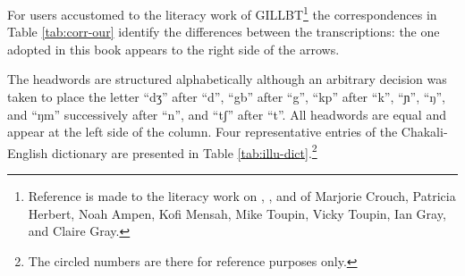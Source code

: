 \newpage 
For users accustomed to the literacy work of GILLBT\footnote{Reference is made to the literacy work on ,  , and   of Marjorie Crouch, Patricia Herbert, Noah Ampen, Kofi Mensah, Mike Toupin, Vicky Toupin, Ian Gray,  and Claire Gray.} the correspondences in Table \ref{tab:corr-our} identify the differences between the transcriptions: the one adopted in this book appears to the right side of the arrows. 

\begin{table} 
\caption[]{Correspondences of orthographies\label{tab:corr-our}}
 \begin{center}
\end{center}
\end{table}



The headwords  are structured alphabetically  although an arbitrary decision was taken to place the letter ``{dʒ}'' after ``{d}'', ``{gb}'' after ``{g}'', ``{kp}'' after ``{k}'',  ``{ɲ}'', ``{ŋ}'',  and ``{ŋm}'' successively after ``{n}'',  and ``{tʃ}'' after ``{t}''.  All headwords are equal and appear at the left side of the column. Four representative entries of the Chakali-English dictionary are presented in Table \ref{tab:illu-dict}.\footnote{The circled numbers are there for reference purposes only.}


